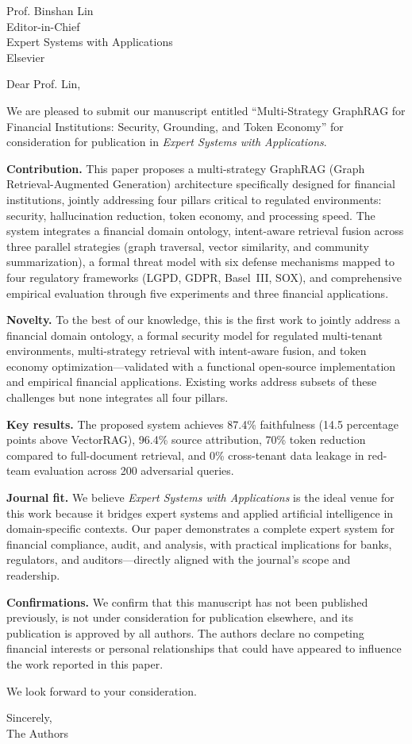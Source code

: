 \documentclass[11pt]{letter}
\begin{document}
\begin{letter}{
Prof. Binshan Lin \\
Editor-in-Chief \\
Expert Systems with Applications \\
Elsevier
}

\opening{Dear Prof. Lin,}

We are pleased to submit our manuscript entitled ``Multi-Strategy GraphRAG for Financial Institutions: Security, Grounding, and Token Economy'' for consideration for publication in \textit{Expert Systems with Applications}.

\textbf{Contribution.} This paper proposes a multi-strategy GraphRAG (Graph Retrieval-Augmented Generation) architecture specifically designed for financial institutions, jointly addressing four pillars critical to regulated environments: security, hallucination reduction, token economy, and processing speed. The system integrates a financial domain ontology, intent-aware retrieval fusion across three parallel strategies (graph traversal, vector similarity, and community summarization), a formal threat model with six defense mechanisms mapped to four regulatory frameworks (LGPD, GDPR, Basel~III, SOX), and comprehensive empirical evaluation through five experiments and three financial applications.

\textbf{Novelty.} To the best of our knowledge, this is the first work to jointly address a financial domain ontology, a formal security model for regulated multi-tenant environments, multi-strategy retrieval with intent-aware fusion, and token economy optimization---validated with a functional open-source implementation and empirical financial applications. Existing works address subsets of these challenges but none integrates all four pillars.

\textbf{Key results.} The proposed system achieves 87.4\% faithfulness (14.5 percentage points above VectorRAG), 96.4\% source attribution, 70\% token reduction compared to full-document retrieval, and 0\% cross-tenant data leakage in red-team evaluation across 200 adversarial queries.

\textbf{Journal fit.} We believe \textit{Expert Systems with Applications} is the ideal venue for this work because it bridges expert systems and applied artificial intelligence in domain-specific contexts. Our paper demonstrates a complete expert system for financial compliance, audit, and analysis, with practical implications for banks, regulators, and auditors---directly aligned with the journal's scope and readership.

\textbf{Confirmations.} We confirm that this manuscript has not been published previously, is not under consideration for publication elsewhere, and its publication is approved by all authors. The authors declare no competing financial interests or personal relationships that could have appeared to influence the work reported in this paper.

We look forward to your consideration.

\closing{Sincerely,\\[2em]
The Authors}

\end{letter}
\end{document}
